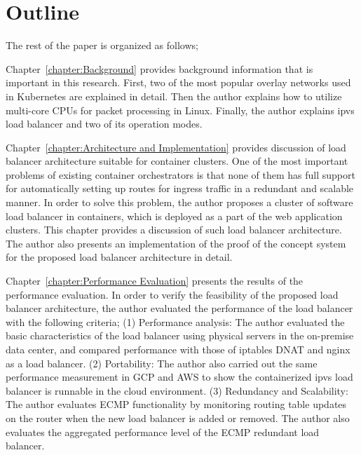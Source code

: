 \section{Outline}

The rest of the paper is organized as follows;

Chapter~\ref{chapter:Background} provides background information that is important in this research.
First, two of the most popular overlay networks used in Kubernetes are explained in detail.
Then the author explains how to utilize multi-core CPUs for packet processing in Linux.
Finally, the author explains ipvs load balancer and two of its operation modes.

Chapter~\ref{chapter:Architecture and Implementation} provides discussion of load balancer architecture suitable for container clusters.
One of the most important problems of existing container orchestrators is that none of them has full support for automatically setting up routes for ingress traffic in a redundant and scalable manner.
In order to solve this problem, the author proposes a cluster of software load balancer in containers, which is deployed as a part of the web application clusters.
This chapter provides a discussion of such load balancer architecture.
The author also presents an implementation of the proof of the concept system for the proposed load balancer architecture in detail.

Chapter~\ref{chapter:Performance Evaluation} presents the results of the performance evaluation.
In order to verify the feasibility of the proposed load balancer architecture, the author evaluated the performance of the load balancer with the following criteria;
(1) Performance analysis:
The author evaluated the basic characteristics of the load balancer using physical servers in the on-premise data center, and compared performance with those of iptables DNAT and nginx as a load balancer.
(2) Portability:
The author also carried out the same performance measurement in GCP and AWS to show the containerized ipvs load balancer is runnable in the cloud environment.
(3) Redundancy and Scalability:
The author evaluates ECMP functionality by monitoring routing table updates on the router when the new load balancer is added or removed.
The author also evaluates the aggregated performance level of the ECMP redundant load balancer.

